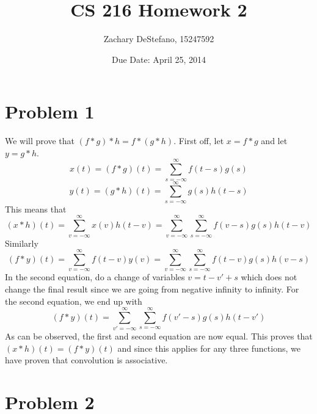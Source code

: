 \documentclass[11pt,psfig]{article}
\begin{document}
\setlength{\parskip}{1.2ex plus0.3ex minus 0.3ex}


\thispagestyle{empty} \pagestyle{myheadings} 



\title{CS 216 Homework 2}
\author{Zachary DeStefano, 15247592}
\date{Due Date: April 25, 2014}

\maketitle

\vfill\eject

\newpage

\section*{Problem 1}

We will prove that $(f*g)*h=f*(g*h)$. First off, let $x=f*g$ and let $y=g*h$. \\
\[
x(t) = (f*g)(t) = \sum_{s=-\infty}^{\infty} f(t-s)g(s)
\]
\[
y(t) = (g*h)(t) = \sum_{s=-\infty}^{\infty} g(s)h(t-s)
\]
This means that
\[
(x*h)(t) = \sum_{v=-\infty}^{\infty} x(v)h(t-v) = \sum_{v=-\infty}^{\infty} \sum_{s=-\infty}^{\infty} f(v-s)g(s)h(t-v)
\]
Similarly
\[
(f*y)(t) = \sum_{v=-\infty}^{\infty} f(t-v)y(v) = \sum_{v=-\infty}^{\infty} \sum_{s=-\infty}^{\infty} f(t-v)g(s)h(v-s)
\]
In the second equation, do a change of variables $v = t-v'+s$ which does not change the final result since we are going from negative infinity to infinity. For the second equation, we end up with \\
\[
(f*y)(t) = \sum_{v'=-\infty}^{\infty} \sum_{s=-\infty}^{\infty} f(v'-s)g(s)h(t-v')
\]
As can be observed, the first and second equation are now equal. This proves that $(x*h)(t)=(f*y)(t)$ and since this applies for any three functions, we have proven that convolution is associative. 

\newpage

\section*{Problem 2}
\end{document}
